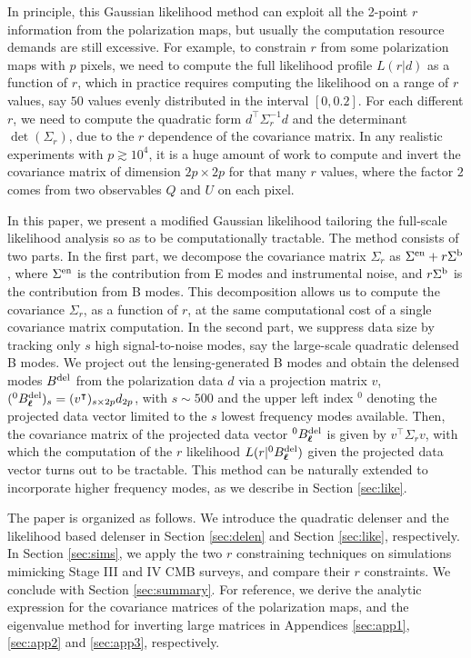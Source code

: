 \documentclass[aps, prd, reprint, nofootinbib, groupedaddress, showpacs]{revtex4-1}
\newcommand*\Bell{\ensuremath{\boldsymbol\ell}}
\begin{document}
In principle, this Gaussian likelihood method can exploit
all the 2-point $r$ information from the polarization maps,
but usually the computation resource demands are still excessive. For example,
to constrain $r$ from some polarization maps with $p$ pixels,
we need to compute the full likelihood profile $L(r|d)$ as a function of $r$,
which in practice requires computing the likelihood on a range of $r$ values,
say $50$  values evenly distributed in the interval $[0, 0.2]$.
For each different $r$, we need to compute the quadratic form $d^\intercal\Sigma_r^{-1} d$ and
the determinant $\det(\Sigma_r)$, due to the $r$ dependence of the covariance matrix.
In any realistic experiments with $p \gtrsim 10^4$,
it is a huge amount of work to compute and invert the covariance matrix of dimension $2p\times 2p$
for that many $r$ values, where the factor $2$ comes from two observables $Q$ and $U$ on each pixel.

In this paper, we present a modified Gaussian likelihood tailoring
the full-scale likelihood analysis so as to be computationally tractable.
The method consists of two parts.
In the first part, we decompose the covariance matrix $\Sigma_r$ as $\Sigma^{\rm en}+ r\Sigma^{\rm b}$,
where $\Sigma^{\rm en}$ is the contribution from E modes and instrumental noise,
and $r\Sigma^{\rm b}$ is the contribution from B modes. This decomposition allows us to compute
the covariance $\Sigma_r$, as a function of $r$,
at the same computational cost of a single covariance matrix computation.
In the second part, we suppress data size by tracking only $s$
high signal-to-noise modes, say the large-scale quadratic delensed B modes.
We project out the lensing-generated B modes and obtain the delensed modes $B^{\rm del}$
from the polarization data $d$ via a projection matrix $v$,
$(^0B^{\rm del}_{\Bell})_s = (v^\intercal)_{s\times 2p} d_{2p}$,
with $s\sim 500$ and the upper left index $^0$ denoting the projected data vector
limited to the $s$ lowest frequency  modes available.
Then, the covariance matrix of the projected data vector  $^0B^{\rm del}_{\Bell}$
is given by $v^\intercal \Sigma_r v$,
with which the computation of the $r$ likelihood  $L(r|^0B^{\rm del}_{\Bell} )$
given the projected data vector turns out to be tractable.
This method can be naturally extended to incorporate higher frequency modes,
as we describe in Section \ref{sec:like}.


The paper is organized as follows. We introduce the quadratic delenser
and the likelihood based delenser in Section \ref{sec:delen} and Section \ref{sec:like}, respectively.
In Section \ref{sec:sims}, we apply the two $r$ constraining techniques
on simulations mimicking Stage III and IV CMB surveys,
and compare their $r$ constraints.
We conclude with Section \ref{sec:summary}. For reference, we derive the analytic expression
for the covariance matrices of the polarization maps, and the eigenvalue method for inverting large matrices
in Appendices \ref{sec:app1}, \ref{sec:app2} and \ref{sec:app3}, respectively.
\end{document}
